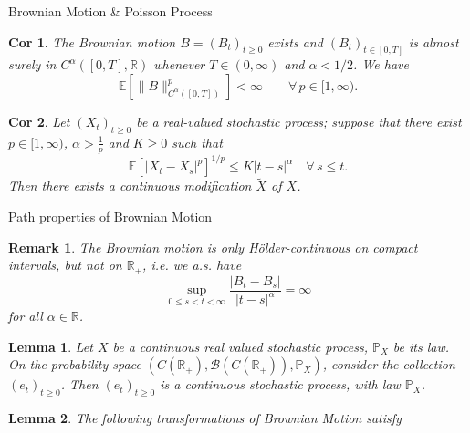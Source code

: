 \documentclass[a4paper]{article}
\theoremstyle{mytheoremstyle}
\newtheorem{lemma}{Lemma}
\newtheorem{corollary}{Cor}[theorem]
\newtheorem*{remark}{Remark}
\newcommand{\1}{\mathds{1}}
\begin{document}
\begin{multicols*}{3}
\begin{roundbox}{Brownian Motion \& Poisson Process}

  \begin{corollary}
    \label{cor:Bm exists}The Brownian motion $B = (B_t)_{t \ge 0}$ exists and
    $(B_t)_{t \in [0, T]}$ is almost surely in $C^{\alpha} ([0, T], \mathbb{R})$
    whenever $T \in (0, \infty)$ and $\alpha < 1 / 2$. We have
    \vspace{-0.5em}
    \[
      \mathbb{E} [\|B\|_{C^{\alpha} ([0, T])}^p] < \infty \qquad \forall \, p
      \in [1, \infty) . \label{eq:holder.continuity.Bm}
    \]
  \end{corollary}

  \begin{corollary}
    \label{cor:kolmogorov.infinite.time}Let $(X_t)_{t \geqslant 0}$ be a
    real-valued stochastic process; suppose that there exist $p \in [1,
    \infty)$, $\alpha > \frac{1}{p}$ and $K \geqslant 0$ such that
    \[ \mathbb{E} [|X_t - X_s |^p]^{1 / p} \leqslant K |t - s|^{\alpha}  \quad
    \forall \, s \leqslant t. \]
    Then there exists a continuous modification $\tilde{X}$ of $X$.
  \end{corollary}
\end{roundbox}

\begin{roundbox}{Path properties of Brownian Motion}
  \begin{remark} \label{rmk:Bm not globally hoelder}
    The Brownian motion is only H{\"o}lder-continuous on compact
    intervals, but not on
    $\mathbb{R}_+$, i.e.  we a.s.  have
    \vspace{-0.25em}
    \[
      \sup_{0 \leqslant s < t < \infty} \frac{| B_t - B_s |}{| t - s
      |^{\alpha}} = \infty
    \]
    for all $\alpha \in \mathbb{R}$.
  \end{remark}

  \begin{lemma}
    Let $X$ be a continuous real valued stochastic process,
    $\mathbb{P}_X$ be its law. On
    the probability space $(C (\mathbb{R}_+), \mathcal{B} (C (\mathbb{R}_+)),
    \mathbb{P}_X)$, consider the collection $(e_t)_{t \geqslant 0}$.
    Then $(e_t)_{t
    \geqslant 0}$ is a continuous stochastic process, with law $\mathbb{P}_X$.
  \end{lemma}

  \begin{lemma}
    \label{prop:brownian path transformation}
    The following transformations of Brownian Motion satisfy


\end{lemma}
\end{roundbox}
\end{multicols*}
\end{document}
